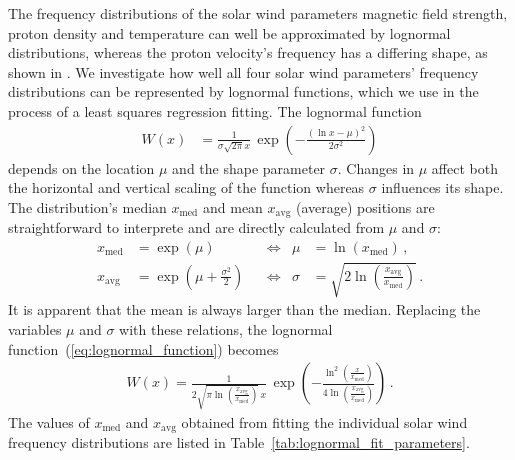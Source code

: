 \documentclass[]{aa}
\begin{document}
	The frequency distributions of the solar wind parameters magnetic field strength, proton density and temperature can
	well be approximated by lognormal distributions, whereas the proton velocity’s frequency has a differing shape, as shown in \citet{Veselovsky2010}. We investigate how well all four solar wind parameters’ frequency distributions can be represented by lognormal functions, which we use in the process of a least squares regression fitting. The lognormal function 
	\begin{align}
		W(x) &= \frac{1}{\sigma \sqrt{2 \pi} x} \, \exp\left(- \frac{\left(\ln x - \mu\right)^2}{2 \sigma^2}\right)	\label{eq:lognormal_function}
	\end{align}
	depends on the location $\mu$ and the shape parameter $\sigma$. Changes in $\mu$ affect both the horizontal and vertical scaling of the function whereas $\sigma$ influences its shape. The distribution's median $x_\text{med}$ and mean $x_\text{avg}$ (average) positions are straightforward to interprete and are directly calculated from $\mu$ and $\sigma$:
	\begin{align}
		x_\text{med} &= \exp\left(\mu\right)	&	&\Longleftrightarrow	&	\mu &= \ln\left(x_\text{med}\right)\,,	\label{eq:lognormal_median}\\
		x_\text{avg} &= \exp\left(\mu + \frac{\sigma^2}{2}\right)	&	&\Longleftrightarrow	&	\sigma &= \sqrt{2 \ln\left(\frac{x_\text{avg}}{x_\text{med}}\right)}\,.	\label{eq:lognormal_mean}
	\end{align}
	It is apparent that the mean is always larger than the median. Replacing the variables $\mu$ and $\sigma$ with these relations, the lognormal function~(\ref{eq:lognormal_function}) becomes
	\begin{align}
		W(x) = \frac{1}{2 \sqrt{\pi \ln\left(\frac{x_\text{avg}}{x_\text{med}}\right)} \, x} \, \exp\left(- \frac{\ln^2\left(\frac{x}{x_\text{med}}\right)}{4 \ln\left(\frac{x_\text{avg}}{x_\text{med}}\right)}\right)\,.	\label{eq:single_lognormal_fit_function}
	\end{align}
	The values of $x_\text{med}$ and $x_\text{avg}$ obtained from fitting the individual solar wind frequency distributions are listed in Table~\ref{tab:lognormal_fit_parameters}.
\end{document}
